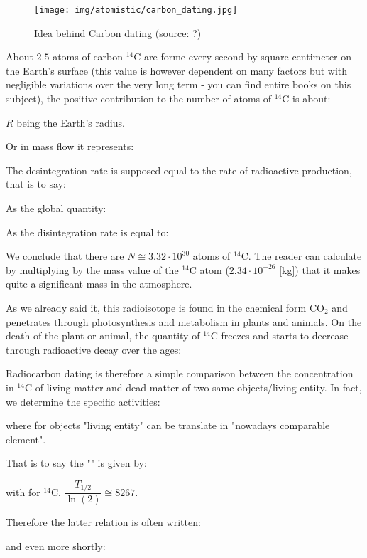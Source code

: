 	\begin{figure}[H]
		\begin{center}
		\texttt{[image: img/atomistic/carbon\_dating.jpg]}
		\end{center}	
		\caption[Idea behind Carbon dating]{Idea behind Carbon dating (source: ?)}
	\end{figure}
	
	About $2.5$ atoms of carbon $^{14}\mathrm{C}$ are forme every second by square centimeter on the Earth's surface (this value is however dependent on many factors but with negligible variations over the very long term - you can find entire books on this subject), the positive contribution to the number of atoms of  $^{14}\mathrm{C}$ is about:
	
	$R$ being the Earth's radius.
	
	Or in mass flow it represents:
	
	The desintegration rate is supposed equal to the rate of radioactive production, that is to say:
	
	As the global quantity:
	
	As the disintegration rate is equal to:
	
	We conclude that there are $N\cong 3.32\cdot 10^{30}$ atoms of $^{14}\mathrm{C}$. The reader can calculate by multiplying by the mass value of the  $^{14}\mathrm{C}$ atom ($2.34\cdot 10^{-26}$ [kg]) that it makes quite a significant mass in the atmosphere.
	
	As we already said it, this radioisotope is found in the chemical form $\mathrm{CO}_2$ and penetrates through photosynthesis and metabolism in plants and animals. On the death of the plant or animal, the quantity of $^{14}\mathrm{C}$ freezes and starts to decrease through radioactive decay over the ages:
	
	Radiocarbon dating is therefore a simple comparison between the concentration in  $^{14}\mathrm{C}$ of living matter and dead matter of two same objects/living entity. In fact, we determine the specific activities:
	
	where for objects "living entity" can be translate in "nowadays comparable element".
	
	That is to say the "" is given by:
	
	with for $^{14}\mathrm{C}$, $\dfrac{T_{1/2}}{\ln(2)}\cong 8267$.
	
	Therefore the latter relation is often written:
	
	and even more shortly:
	
